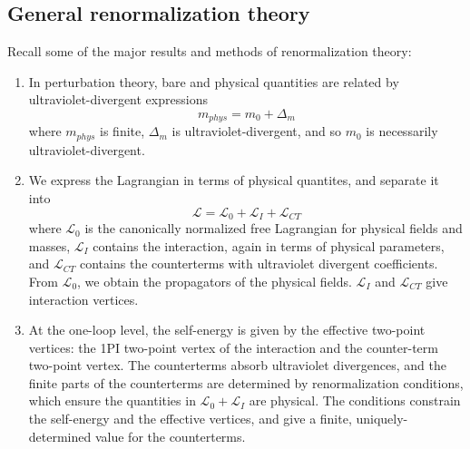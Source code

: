 \subsection{General renormalization theory}
Recall some of the major results and methods of renormalization theory:
\begin{enumerate}
\item In perturbation theory, bare and physical quantities are related by ultraviolet-divergent expressions
\[m_{phys} = m_0 + \Delta_m\]
where $m_{phys}$ is finite, $\Delta_m$ is ultraviolet-divergent, and so $m_0$ is necessarily ultraviolet-divergent.
\item We express the Lagrangian in terms of physical quantites, and separate it into
\[\mathcal{L} = \mathcal{L}_0 + \mathcal{L}_I + \mathcal{L}_{CT}\]
where $\mathcal{L}_0$ is the canonically normalized free Lagrangian for physical fields and masses, $\mathcal{L}_I$ contains the interaction, again in terms of physical parameters, and $\mathcal{L}_{CT}$ contains the counterterms with ultraviolet divergent coefficients. From $\mathcal{L}_0$, we obtain the propagators of the physical fields. $\mathcal{L}_I$ and $\mathcal{L}_{CT}$ give
interaction vertices.
\item At the one-loop level, the self-energy is given by the effective two-point vertices: the 1PI two-point vertex of the interaction and the counter-term two-point vertex. The counterterms absorb ultraviolet divergences, and the finite parts of the counterterms are determined by renormalization conditions,
which ensure the quantities in $\mathcal{L}_0 + \mathcal{L}_I$ are physical. The conditions constrain the self-energy and the effective vertices, and give a finite, uniquely-determined value for the counterterms.
\end{enumerate}
